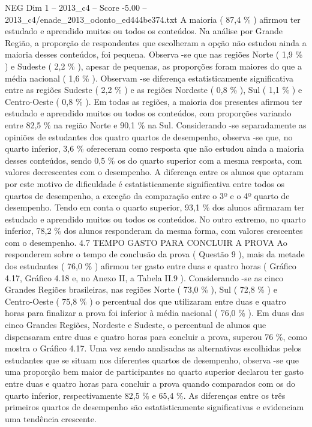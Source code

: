 \begin{textsample}{NEG Dim 1 – 2013\_c4 – Score -5.00 – 2013\_c4/enade\_2013\_odonto\_ed444be374.txt}
A maioria ( 87,4 \% ) afirmou ter estudado e aprendido muitos ou todos os conteúdos.
Na análise por Grande Região, a proporção de respondentes que escolheram a opção não estudou ainda a maioria desses conteúdos, foi pequena.
Observa -se que nas regiões Norte ( 1,9 \% ) e Sudeste ( 2,2 \% ), apesar de pequenas, as proporções foram maiores do que a média nacional ( 1,6 \% ).
Observam -se diferença estatisticamente significativa entre as regiões Sudeste ( 2,2 \% ) e as regiões Nordeste ( 0,8 \% ), Sul ( 1,1 \% ) e Centro-Oeste ( 0,8 \% ).
Em todas as regiões, a maioria dos presentes afirmou ter estudado e aprendido muitos ou todos os conteúdos, com proporções variando entre 82,5 \% na região Norte e 90,1 \% na Sul.
Considerando -se separadamente as opiniões de estudantes dos quatro quartos de desempenho, observa -se que, no quarto inferior, 3,6 \% ofereceram como resposta que não estudou ainda a maioria desses conteúdos, sendo 0,5 \% os do quarto superior com a mesma resposta, com valores decrescentes com o desempenho.
A diferença entre os alunos que optaram por este motivo de dificuldade é estatisticamente significativa entre todos os quartos de desempenho, a exceção da comparação entre o 3º e o 4º quarto de desempenho.
Tendo em conta o quarto superior, 93,1 \% dos alunos afirmaram ter estudado e aprendido muitos ou todos os conteúdos.
No outro extremo, no quarto inferior, 78,2 \% dos alunos responderam da mesma forma, com valores crescentes com o desempenho. 4.7 TEMPO GASTO PARA CONCLUIR A PROVA Ao responderem sobre o tempo de conclusão da prova ( Questão 9 ), mais da metade dos estudantes ( 76,0 \% ) afirmou ter gasto entre duas e quatro horas ( Gráfico 4.17, Gráfico 4.18 e, no Anexo II, a Tabela II.9 ).
Considerando -se as cinco Grandes Regiões brasileiras, nas regiões Norte ( 73,0 \% ), Sul ( 72,8 \% ) e Centro-Oeste ( 75,8 \% ) o percentual dos que utilizaram entre duas e quatro horas para finalizar a prova foi inferior à média nacional ( 76,0 \% ).
Em duas das cinco Grandes Regiões, Nordeste e Sudeste, o percentual de alunos que dispensaram entre duas e quatro horas para concluir a prova, superou 76 \%, como mostra o Gráfico 4.17.
Uma vez sendo analisadas as alternativas escolhidas pelos estudantes que se situam nos diferentes quartos de desempenho, observa -se que uma proporção bem maior de participantes no quarto superior declarou ter gasto entre duas e quatro horas para concluir a prova quando comparados com os do quarto inferior, respectivamente 82,5 \% e 65,4 \%.
As diferenças entre os três primeiros quartos de desempenho são estatisticamente significativas e evidenciam uma tendência crescente.

\end{textsample}
